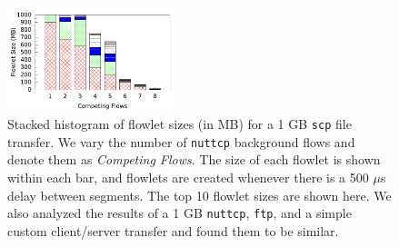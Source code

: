 \begin{figure}[t]
        \centering
  \includegraphics[width=0.45\textwidth]{presto/figures/flowlets/histo.pdf}
        \caption{Stacked histogram of flowlet sizes (in MB) for a 1 GB {\tt scp} file transfer. We vary the number of {\tt nuttcp} background flows and
                denote them as {\em Competing Flows}. The size of each flowlet is shown within each bar, and flowlets
                are created whenever there is a 500 $\mu$s delay between segments. The top 10 flowlet sizes are shown here.
                We also analyzed the results of a 1 GB {\tt nuttcp}, {\tt ftp}, and a simple custom client/server transfer and found them
                to be similar. }
        \label{micro_flowlet_size}
\end{figure}



